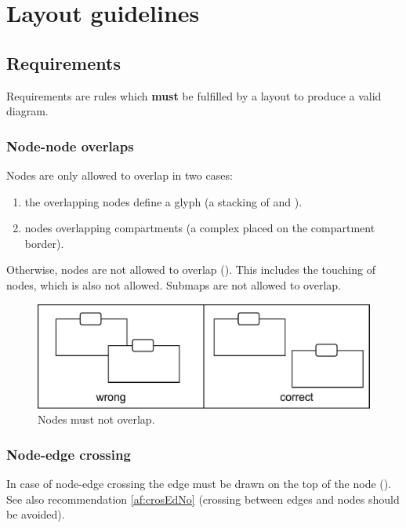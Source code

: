 \newpage

\section{Layout guidelines}

\subsection{Requirements}

Requirements are rules which \textbf{must} be fulfilled by a layout to
produce a valid \SBGNAFLone diagram.

\subsubsection{Node-node overlaps}
\label{af:NoNoOv}

Nodes are only allowed to overlap in two cases:
\begin{enumerate}
  \item the overlapping nodes define a glyph (\eg a stacking of 
  and ).
  \item nodes overlapping compartments
  (\eg a complex placed on the compartment border).
\end{enumerate}
Otherwise, nodes are not allowed to overlap (). This includes the
touching of nodes, which is also not allowed. Submaps
are not allowed to overlap.

\begin{figure}[h!]
  \centering
  \includegraphics[scale=0.3]{images/layout-node-node}
  \caption{Nodes must not overlap.}\label{fig:af:layout1}
\end{figure}

\subsubsection{Node-edge crossing}
\label{af:crosEdNoRe}

In case of node-edge crossing the edge must be drawn on the top of
the node (). See also recommendation \ref{af:crosEdNo} (crossing between
edges and nodes should be avoided).

